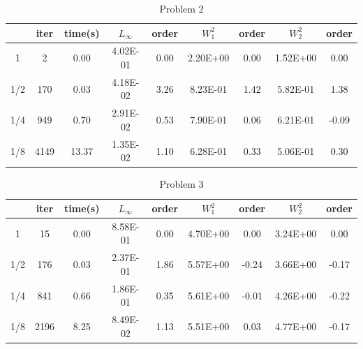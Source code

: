 \documentclass{article}
\begin{document}
\begin{table}[H]
	\centering
	\caption{Problem 2}
	\begin{tabular}{|c|c|c|c|c|c|c|c|c|}
		\hline
		& iter & time(s) & $L_{\infty}$ & order & $W_1^2$  & order & $W_2^2$  & order \\ \hline
		1   & 2    & 0.00    & 4.02E-01     & 0.00  & 2.20E+00 & 0.00  & 1.52E+00 & 0.00  \\ \hline
		1/2 & 170  & 0.03    & 4.18E-02     & 3.26  & 8.23E-01 & 1.42  & 5.82E-01 & 1.38  \\ \hline
		1/4 & 949  & 0.70    & 2.91E-02     & 0.53  & 7.90E-01 & 0.06  & 6.21E-01 & -0.09 \\ \hline
		1/8 & 4149 & 13.37   & 1.35E-02     & 1.10  & 6.28E-01 & 0.33  & 5.06E-01 & 0.30  \\ \hline
	\end{tabular}
\end{table}

\begin{table}[H]
	\centering
	\caption{Problem 3}
	\begin{tabular}{|c|c|c|c|c|c|c|c|c|}
		\hline
		& iter & time(s) & $L_{\infty}$ & order & $W_1^2$  & order & $W_2^2$  & order \\ \hline
		1   & 15   & 0.00    & 8.58E-01     & 0.00  & 4.70E+00 & 0.00  & 3.24E+00 & 0.00  \\ \hline
		1/2 & 176  & 0.03    & 2.37E-01     & 1.86  & 5.57E+00 & -0.24 & 3.66E+00 & -0.17 \\ \hline
		1/4 & 841  & 0.66    & 1.86E-01     & 0.35  & 5.61E+00 & -0.01 & 4.26E+00 & -0.22 \\ \hline
		1/8 & 2196 & 8.25    & 8.49E-02     & 1.13  & 5.51E+00 & 0.03  & 4.77E+00 & -0.17 \\ \hline
	\end{tabular}
\end{table}
\end{document}
